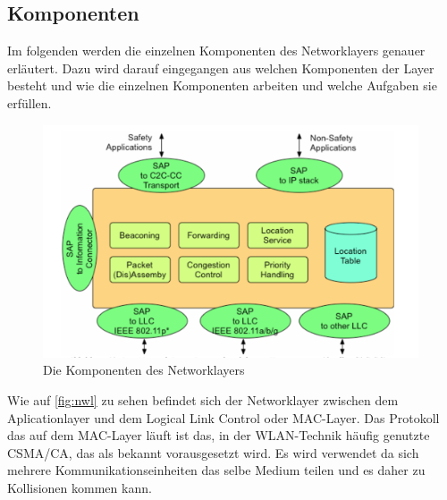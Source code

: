 \subsection{Komponenten}
Im folgenden werden die einzelnen Komponenten des Networklayers genauer erläutert. Dazu wird darauf eingegangen aus welchen Komponenten der Layer besteht und wie die einzelnen Komponenten arbeiten und welche Aufgaben sie erfüllen.
\begin{figure}
\includegraphics[width=0.99\textwidth]{content/images/03_networklayer/networklayer.jpg}
\caption{Die Komponenten des Networklayers\cite{C2C-manifesto}}
\label{fig:nwl}
\end{figure}
Wie auf \autoref{fig:nwl} zu sehen befindet sich der Networklayer zwischen dem Aplicationlayer und dem Logical Link Control oder MAC-Layer. Das Protokoll das auf dem MAC-Layer läuft ist das, in der WLAN-Technik häufig genutzte CSMA/CA, das als bekannt vorausgesetzt wird. Es wird verwendet da sich mehrere Kommunikationseinheiten das selbe Medium teilen und es daher zu Kollisionen kommen kann. 

